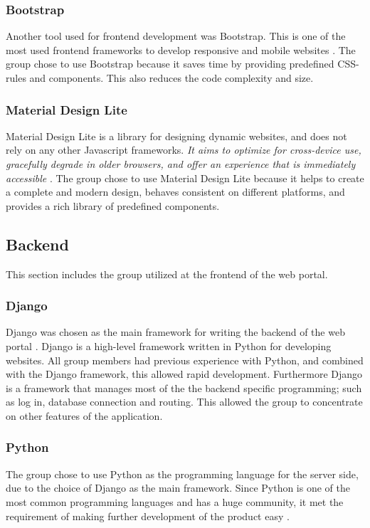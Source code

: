 \subsubsection{Bootstrap}
Another tool used for frontend development was Bootstrap. This is one of the most used frontend frameworks to develop responsive and mobile websites \cite{Bootstrap}. The group chose to use Bootstrap because it saves time by providing predefined CSS-rules and components. This also reduces the code complexity and size. 

\subsubsection{Material Design Lite}
\label{mdl}
Material Design Lite is a library for designing dynamic websites, and does not rely on any other Javascript frameworks. \textit{It aims to optimize for cross-device use, gracefully degrade in older browsers, and offer an experience that is immediately accessible} \cite{Material_Design_Lite}. The group chose to use Material Design Lite because it helps to create a complete and modern design, behaves consistent on different platforms, and provides a rich library of predefined components.

\subsection{Backend}
\label{backEnd}
This section includes the group utilized at the frontend of the web portal.

\subsubsection{Django}
\label{django}
Django was chosen as the main framework for writing the backend of the web portal \cite{django}. Django is a high-level framework written in Python for developing websites. All group members had previous experience with Python, and combined with the Django framework, this allowed rapid development. Furthermore Django is a framework that manages most of the the backend specific programming; such as log in, database connection and routing. This allowed the group to concentrate on other features of the application. 

\subsubsection{Python}
\label{python}
The group chose to use Python as the programming language for the server side, due to the choice of Django as the main framework. Since Python is one of the most common programming languages and has a huge community, it met the requirement of making further development of the product easy \cite{Programminglanguagespopularity}.

